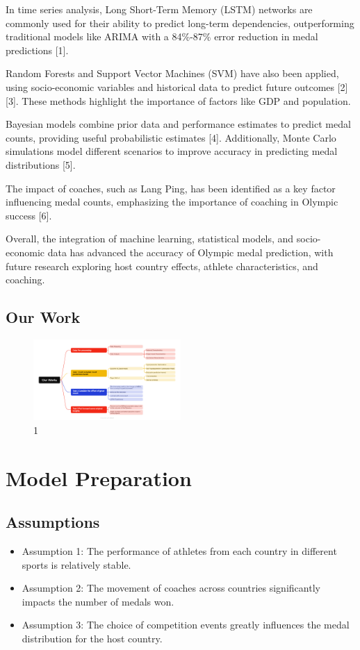 \documentclass{mcmthesis}
\begin{document}
In time series analysis, Long Short-Term Memory (LSTM) networks are commonly used for their ability to predict long-term dependencies, outperforming traditional models like ARIMA with a 84\%-87\% error reduction in medal predictions [1].

Random Forests and Support Vector Machines (SVM) have also been applied, using socio-economic variables and historical data to predict future outcomes [2][3]. These methods highlight the importance of factors like GDP and population.

Bayesian models combine prior data and performance estimates to predict medal counts, providing useful probabilistic estimates [4]. Additionally, Monte Carlo simulations model different scenarios to improve accuracy in predicting medal distributions [5].

The impact of coaches, such as Lang Ping, has been identified as a key factor influencing medal counts, emphasizing the importance of coaching in Olympic success [6].

Overall, the integration of machine learning, statistical models, and socio-economic data has advanced the accuracy of Olympic medal prediction, with future research exploring host country effects, athlete characteristics, and coaching.
\subsection{Our Work}
\begin{figure}[h] %
	\centering %
	\includegraphics[width=0.5\textwidth]{figure/0.png} %
	\caption{1} %
	\label{fig:example} %
\end{figure}

  \section{Model Preparation}
  \subsection{Assumptions}
  \begin{itemize}
    \item Assumption 1: The performance of athletes from each country in different sports is relatively stable.
    \item Assumption 2: The movement of coaches across countries significantly impacts the number of medals won.  
    \item Assumption 3: The choice of competition events greatly influences the medal distribution for the host country.
    \end{itemize}
    
\end{document}
